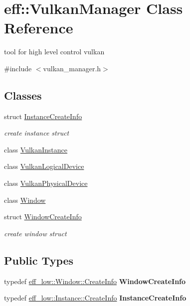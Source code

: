 \hypertarget{classeff_1_1VulkanManager}{}\section{eff\+:\+:Vulkan\+Manager Class Reference}
\label{classeff_1_1VulkanManager}


tool for high level control vulkan  




{\ttfamily \#include $<$vulkan\+\_\+manager.\+h$>$}

\subsection*{Classes}
\begin{DoxyCompactItemize}
\item 
struct \mbox{\hyperlink{structeff_1_1VulkanManager_1_1InstanceCreateInfo}{Instance\+Create\+Info}}
\begin{DoxyCompactList}\small\item\em create instance struct \end{DoxyCompactList}\item 
class \mbox{\hyperlink{classeff_1_1VulkanManager_1_1VulkanInstance}{Vulkan\+Instance}}
\item 
class \mbox{\hyperlink{classeff_1_1VulkanManager_1_1VulkanLogicalDevice}{Vulkan\+Logical\+Device}}
\item 
class \mbox{\hyperlink{classeff_1_1VulkanManager_1_1VulkanPhysicalDevice}{Vulkan\+Physical\+Device}}
\item 
class \mbox{\hyperlink{classeff_1_1VulkanManager_1_1Window}{Window}}
\item 
struct \mbox{\hyperlink{structeff_1_1VulkanManager_1_1WindowCreateInfo}{Window\+Create\+Info}}
\begin{DoxyCompactList}\small\item\em create window struct \end{DoxyCompactList}\end{DoxyCompactItemize}
\subsection*{Public Types}
\begin{DoxyCompactItemize}
\item 
\mbox{\label{classeff_1_1VulkanManager_a144f9fe8cdc4fc610cde5d164e13df62}} 
typedef \mbox{\hyperlink{structeff_1_1eff__low_1_1Window_1_1CreateInfo}{eff\+\_\+low\+::\+Window\+::\+Create\+Info}} {\bfseries Window\+Create\+Info}
\item 
\mbox{\label{classeff_1_1VulkanManager_a2c3476ea07d335145411729160fefa11}} 
typedef \mbox{\hyperlink{structeff_1_1eff__low_1_1Instance_1_1CreateInfo}{eff\+\_\+low\+::\+Instance\+::\+Create\+Info}} {\bfseries Instance\+Create\+Info}
\end{DoxyCompactItemize}
